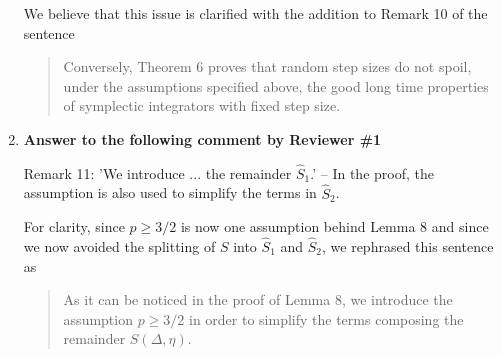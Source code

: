 \documentclass[10pt]{article}
\begin{document}
\begin{enumerate}
\begin{itquote}
	\end{itquote}
	We believe that this issue is clarified with the addition to Remark 10 of the sentence 
	\begin{quote}
		Conversely, Theorem 6 proves that random step sizes do not spoil, under the assumptions specified above, the good long time properties of symplectic integrators with fixed step size.
	\end{quote}
	\item \textbf{Answer to the following comment by Reviewer \#1}
	\begin{itquote}
		Remark 11: 'We introduce ... the remainder $\widehat{S}_1$.' -- In the proof, the assumption is also used to simplify the terms in $\widehat{S}_2$.
	\end{itquote}
	For clarity, since $p \geq 3/2$ is now one assumption behind Lemma 8 and since we now avoided the splitting of $S$ into $\hat S_1$ and $\hat S_2$, we rephrased this sentence as
	\begin{quote}
		 As it can be noticed in the proof of Lemma 8, we introduce the assumption $p \geq 3/2$ in order to simplify the terms composing the remainder $S(\Delta, \eta)$.
	\end{quote}
\end{enumerate}
\end{document}
